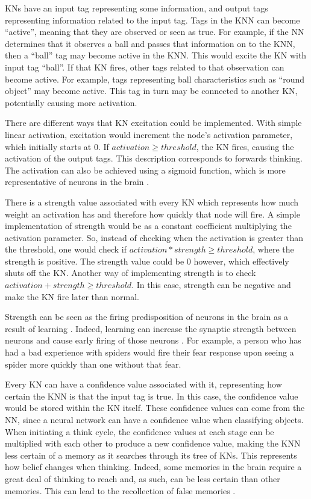 \documentclass[titlepage,11pt]{article}
\begin{document}
KNs have an input tag representing some information, and output tags representing information related to the input tag. Tags in the KNN can become ``active'', meaning that they are observed or seen as true. For example, if the NN determines that it observes a ball and passes that information on to the KNN, then a ``ball'' tag may become active in the KNN. This would excite the KN with input tag ``ball''. If that KN fires, other tags related to that observation can become active. For example, tags representing ball characteristics such as ``round object'' may become active. This tag in turn may be connected to another KN, potentially causing more activation.

There are different ways that KN excitation could be implemented. With simple linear activation, excitation would increment the node's activation parameter, which initially starts at 0. If $activation \geq threshold$, the KN fires, causing the activation of the output tags. This description corresponds to forwards thinking. The activation can also be achieved using a sigmoid function, which is more representative of neurons in the brain \cite{neuro}.


There is a strength value associated with every KN which represents how much weight an activation has and therefore how quickly that node will fire. A simple implementation of strength would be as a constant coefficient multiplying the activation parameter. So, instead of checking when the activation is greater than the threshold, one would check if $activation * strength \geq threshold$, where the strength is positive. The strength value could be 0 however, which effectively shuts off the KN. Another way of implementing strength is to check $activation + strength \geq threshold$. In this case, strength can be negative and make the KN fire later than normal.

Strength can be seen as the firing predisposition of neurons in the brain as a result of learning \cite{vybihal-knowledge}. Indeed, learning can increase the synaptic strength between neurons and cause early  firing of those neurons \cite{hebb}. For example, a person who has had a bad experience with spiders would fire their fear response upon seeing a spider more quickly than one without that fear.

Every KN can have a confidence value associated with it, representing how certain the KNN is that the input tag is true. In this case, the confidence value would be stored within the KN itself. These confidence values can come from the NN, since a neural network can have a confidence value when classifying objects. When initiating a think cycle, the confidence values at each stage can be multiplied with each other to produce a new confidence value, making the KNN less certain of a memory as it searches through its tree of KNs. This represents how belief changes when thinking. Indeed, some memories in the brain require a great deal of thinking to reach and, as such, can be less certain than other memories. This can lead to the recollection of false memories \cite{falsememories}.
\end{document}
